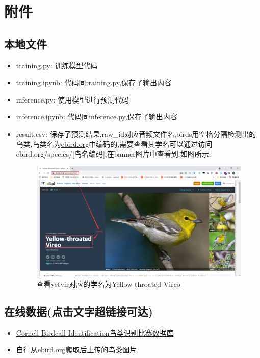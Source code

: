 \section{附件}

\subsection{本地文件}

\begin{itemize}
	\item training.py:     训练模型代码
	\item training.ipynb:  代码同training.py,保存了输出内容
	\item inference.py:    使用模型进行预测代码
	\item inference.ipynb: 代码同inference.py,保存了输出内容
	\item result.csv:      保存了预测结果,raw\_id对应音频文件名,birds用空格分隔检测出的鸟类,鸟类名为\href{ebird.org}{ebird.org}中编码的,需要查看其学名可以通过访问ebird.org/species/[鸟名编码],在banner图片中查看到.如图所示:
	\begin{figure}[thbp!]
		\centering
		\includegraphics[scale=0.2]{figure/find_name}
		\caption{查看yetvir对应的学名为Yellow-throated Vireo}
	\end{figure}
\end{itemize}

\subsection{在线数据(点击文字超链接可达)}

\begin{itemize}
	\item \href{https://www.kaggle.com/c/birdsong-recognition}{Cornell Birdcall Identification鸟类识别比赛数据库}
	\item \href{https://www.kaggle.com/tsuipo/bird-pic}{自行从\href{ebird.org}{ebird.org}爬取后上传的鸟类图片}
\end{itemize}